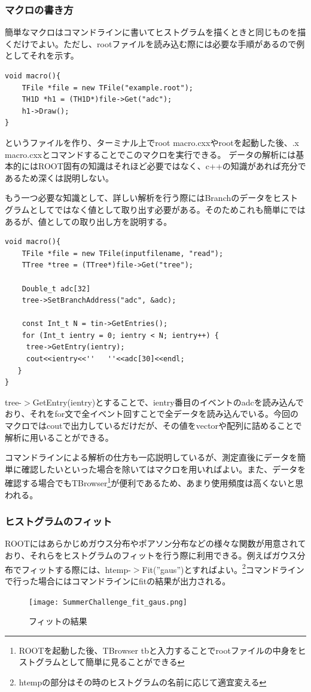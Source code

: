 \subsubsection{マクロの書き方}
簡単なマクロはコマンドラインに書いてヒストグラムを描くときと同じものを描くだけでよい。ただし、rootファイルを読み込む際には必要な手順があるので例としてそれを示す。
\begin{lstlisting}[basicstyle=\ttfamily\footnotesize, frame=single]
void macro(){
	TFile *file = new TFile("example.root");
	TH1D *h1 = (TH1D*)file->Get("adc");
	h1->Draw();
}
 \end{lstlisting}
というファイルを作り、ターミナル上でroot macro.cxxやrootを起動した後、.x macro.cxxとコマンドすることでこのマクロを実行できる。
データの解析には基本的にはROOT固有の知識はそれほど必要ではなく、c++の知識があれば充分であるため深くは説明しない。

もう一つ必要な知識として、詳しい解析を行う際にはBranchのデータをヒストグラムとしてではなく値として取り出す必要がある。そのためこれも簡単にではあるが、値としての取り出し方を説明する。

\begin{lstlisting}
void macro(){
    TFile *file = new TFile(inputfilename, "read");
    TTree *tree = (TTree*)file->Get("tree");

    Double_t adc[32]
    tree->SetBranchAddress("adc", &adc);

    const Int_t N = tin->GetEntries();
    for (Int_t ientry = 0; ientry < N; ientry++) {
     tree->GetEntry(ientry);
     cout<<ientry<<''   ''<<adc[30]<<endl;
   }
}
 \end{lstlisting}

tree-$>$GetEntry(ientry)とすることで、ientry番目のイベントのadcを読み込んでおり、それをfor文で全イベント回すことで全データを読み込んでいる。今回のマクロではcoutで出力しているだけだが、その値をvectorや配列に詰めることで解析に用いることができる。

コマンドラインによる解析の仕方も一応説明しているが、測定直後にデータを簡単に確認したいといった場合を除いてはマクロを用いればよい。また、データを確認する場合でもTBrowser\footnote{ROOTを起動した後、TBrowser tbと入力することでrootファイルの中身をヒストグラムとして簡単に見ることができる}が便利であるため、あまり使用頻度は高くないと思われる。

\subsubsection{ヒストグラムのフィット}
ROOTにはあらかじめガウス分布やポアソン分布などの様々な関数が用意されており、それらをヒストグラムのフィットを行う際に利用できる。例えばガウス分布でフィットする際には、htemp-$>$Fit(''gaus'')とすればよい。\footnote{htempの部分はその時のヒストグラムの名前に応じて適宜変える}コマンドラインで行った場合にはコマンドラインにfitの結果が出力される。
\begin{figure}[h]
  \begin{center}
    \texttt{[image: SummerChallenge\_fit\_gaus.png]}
    \caption{フィットの結果}
    \label{fig:fit_gaus}
  \end{center}
\end{figure}

